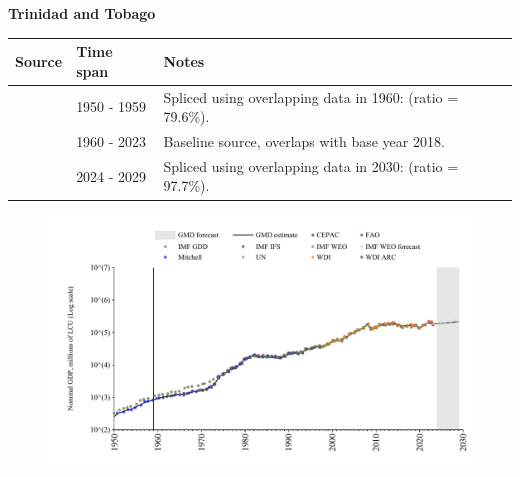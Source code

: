 \documentclass[12pt,a4paper,landscape]{article}
\begin{document}
\begin{adjustbox}{max totalsize={\paperwidth}{\paperheight},center}
\begin{minipage}[t][\textheight][t]{\textwidth}
\vspace*{0.5cm}
{}
\begin{center}
{\Large\bfseries Trinidad and Tobago}
\end{center}
\vspace{0.5cm}
\begin{table}[H]
\centering
\small
\begin{tabular}{|l|l|l|}
\hline
\textbf{Source} & \textbf{Time span} & \textbf{Notes} \\
\hline
\rowcolor{white}\cite{IMF_GDD}& 1950 - 1959 &Spliced using overlapping data in 1960: (ratio = 79.6\%).\\
\rowcolor{lightgray}\cite{WDI}& 1960 - 2023 &Baseline source, overlaps with base year 2018.\\
\rowcolor{white}\cite{IMF_WEO_forecast}& 2024 - 2029 &Spliced using overlapping data in 2030: (ratio = 97.7\%).\\
\hline
\end{tabular}
\end{table}
\begin{figure}[H]
\centering
\includegraphics[width=\textwidth,height=0.6\textheight,keepaspectratio]{graphs/TTO_nGDP.pdf}
\end{figure}
\end{minipage}
\end{adjustbox}
\end{document}
